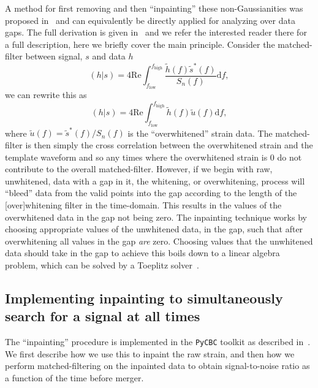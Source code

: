 A method for first removing and then ``inpainting'' these non-Gaussianities was proposed in~\cite{Zackay:2019kkv} and can equivalently be directly applied for analyzing over data gaps.
The full derivation is given in~\cite{Zackay:2019kkv,Capano:2021etf} and we refer the interested reader there for a full description, here we briefly cover the main principle.
Consider the matched-filter between signal, $s$ and data $h$
%
\begin{equation}
    (h|s) = 4\mathrm{Re}\int_{f_\mathrm{low}}^{f_\mathrm{high}}\frac{\tilde{h}(f)\tilde{s}^*(f)}{S_n(f)} \mathrm{d} f,
\end{equation}
%
we can rewrite this as
%
\begin{equation}
    (h|s) = 4\mathrm{Re}\int_{f_\mathrm{low}}^{f_\mathrm{high}} \tilde{h}(f) \tilde{u}(f)  \mathrm{d} f,
\end{equation}
%
where $\tilde{u}(f) = \tilde{s}^*(f) / S_n(f)$ is the ``overwhitened'' strain data.
The matched-filter is then simply the cross correlation between the overwhitened strain and the template waveform and so any times where the overwhitened strain is 0 do not contribute to the overall matched-filter.
However, if we begin with raw, unwhitened, data with a gap in it, the whitening, or overwhitening, process will ``bleed'' data from the valid points into the gap according to the length of the [over]whitening filter in the time-domain.
This results in the values of the overwhitened data in the gap not being zero.
The inpainting technique works by choosing appropriate values of the unwhitened data, in the gap, such that after overwhitening all values in the gap \emph{are} zero.
Choosing values that the unwhitened data should take in the gap to achieve this boils down to a linear algebra problem, which can be solved by a Toeplitz solver~\cite{Zackay:2019kkv}.

\subsection{Implementing inpainting to simultaneously search for a signal at all times}

The ``inpainting'' procedure is implemented in the \texttt{PyCBC} toolkit as described in~\cite{Capano:2021etf}.
We first describe how we use this to inpaint the raw strain, and then how we perform matched-filtering on the inpainted data to obtain signal-to-noise ratio as a function of the time before merger.

